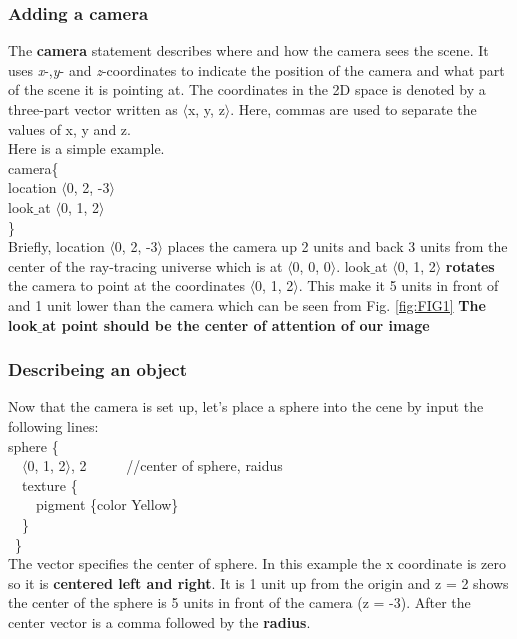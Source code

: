 \documentclass[fleqn,10pt]{wlscirep}
\begin{document}
\subsubsection{Adding a camera}
The \textbf{camera} statement describes where and how the camera sees the scene. It uses \emph{x}-,\emph{y}- and \emph{z}-coordinates to indicate the position of the camera and what part of the scene it is pointing at. The coordinates in the 2D space is denoted by a three-part vector written as $\langle$x, y, z$\rangle$. Here, commas are used to separate the values of x, y and z.\\
\newline
Here is a simple example.\\
\textcolor[rgb]{0.2,0.1,1}{camera\{}  \\
\textcolor[rgb]{0.2,0.1,1}{  location $\langle$0, 2, -3$\rangle$}  \\
\textcolor[rgb]{0.2,0.1,1}{  look$\_$at $\langle$0, 1, 2$\rangle$}  \\
\textcolor[rgb]{0.2,0.1,1}{\}} \\
\newline
Briefly, \textcolor[rgb]{0.2,0.1,1}{  location $\langle$0, 2, -3$\rangle$}  places the camera up 2 units and back 3 units from the center of the ray-tracing universe which is at \textcolor[rgb]{0.2,0.1,1}{$\langle$0, 0, 0$\rangle$}. \textcolor[rgb]{0.2,0.1,1}{look$\_$at $\langle$0, 1, 2$\rangle$} \textbf{rotates} the camera to point at the coordinates \textcolor[rgb]{0.2,0.1,1}{$\langle$0, 1, 2$\rangle$}. This make it 5 units in  front of and 1 unit lower than the camera which can be seen from Fig. \ref{fig:FIG1} \textbf{The \textcolor[rgb]{0.2,0.1,1}{look$\_$at} point should be the center of attention of our image }

\subsubsection{Describeing an object}
Now that the camera is set up, let's place a sphere into the cene by input the following lines:\\
\textcolor[rgb]{0.2,0.1,1}{sphere \{} \\
\textcolor[rgb]{0.2,0.1,1}{\ \ $\langle$0, 1, 2$\rangle$, 2}    \ \ \ \ \  //center of sphere, raidus\\
\textcolor[rgb]{0.2,0.1,1}{\ \ texture \{} \\
\textcolor[rgb]{0.2,0.1,1}{\ \ \ \ pigment \{color Yellow\}} \\
\textcolor[rgb]{0.2,0.1,1}{\ \ \}} \\
\textcolor[rgb]{0.2,0.1,1}{\ \}} \\
The vector specifies the center of sphere. In this example the x coordinate is zero so it is \textbf{centered left and right}. It is 1 unit up from the origin and z = 2 shows the center of the sphere is 5 units in front of the camera (z = -3). After the center vector is a comma followed by the \textbf{radius}.
\end{document}
